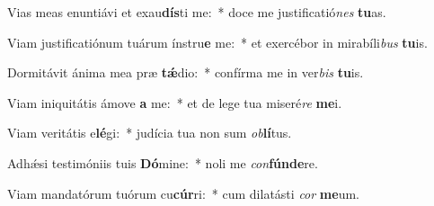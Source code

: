 \item Vias meas enuntiávi et exau\textbf{dís}ti me:~* doce me justificatió\textit{nes} \textbf{tu}as.
\item Viam justificatiónum tuárum ínstru\textbf{e} me:~* et exercébor in mirabíli\textit{bus} \textbf{tu}is.
\item Dormitávit ánima mea præ \textbf{tǽ}dio:~* confírma me in ver\textit{bis} \textbf{tu}is.
\item Viam iniquitátis ámove \textbf{a} me:~* et de lege tua miseré\textit{re} \textbf{me}i.
\item Viam veritátis e\textbf{lé}gi:~* judícia tua non sum \textit{ob}\textbf{lí}tus.
\item Adhǽsi testimóniis tuis \textbf{Dó}mine:~* noli me \textit{con}\textbf{fún}\textbf{de}re.
\item Viam mandatórum tuórum cu\textbf{cúr}ri:~* cum dilatásti \textit{cor} \textbf{me}um.

